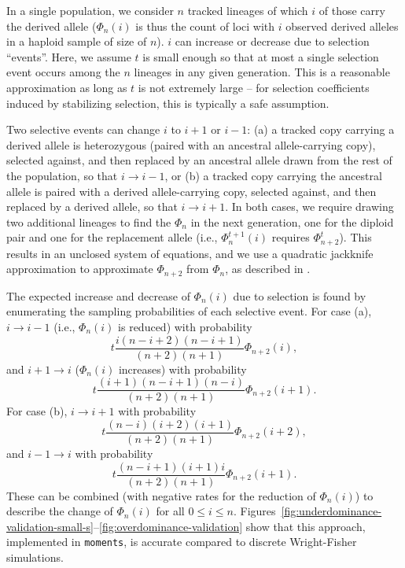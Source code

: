 \documentclass[]{article}
\newcommand{\moments}{\texttt{moments}\xspace}
\begin{document}
In a single population, we consider $n$ tracked lineages of which $i$ of those
carry the derived allele (\(\Phi_n(i)\) is thus the count of loci with $i$
observed derived alleles in a haploid sample of size of $n$). $i$ can increase
or decrease due to selection ``events''. Here, we assume $t$ is small enough so
that at most a single selection event occurs among the $n$ lineages in any
given generation. This is a reasonable approximation as long as $t$ is not
extremely large \citep{jouganous2017inferring, krukov2021taming} -- for
selection coefficients induced by stabilizing selection, this is typically a
safe assumption.

Two selective events can change $i$ to $i+1$ or $i-1$: (a) a tracked copy
carrying a derived allele is heterozygous (paired with an ancestral
allele-carrying copy), selected against, and then replaced by an ancestral
allele drawn from the rest of the population, so that \(i\rightarrow i-1\), or
(b) a tracked copy carrying the ancestral allele is paired with a derived
allele-carrying copy, selected against, and then replaced by a derived allele,
so that \(i\rightarrow i+1\). In both cases, we require drawing two additional
lineages to find the \(\Phi_n\) in the next generation, one for the diploid
pair and one for the replacement allele (i.e., \(\Phi_n^{t+1}(i)\) requires
\(\Phi_{n+2}^t\)). This results in an unclosed system of equations, and we use
a quadratic jackknife approximation to approximate \(\Phi_{n+2}\) from
\(\Phi_n\), as described in \citet{jouganous2017inferring}.

The expected increase and decrease of $\Phi_n(i)$ due to selection is found by
enumerating the sampling probabilities of each selective event. For case (a),
\(i\rightarrow i-1\) (i.e., \(\Phi_n(i)\) is reduced) with probability
\[t\frac{i(n-i+2)(n-i+1)}{(n+2)(n+1)}\Phi_{n+2}(i),\] and \(i+1\rightarrow i\)
(\(\Phi_n(i)\) increases) with probability
\[t\frac{(i+1)(n-i+1)(n-i)}{(n+2)(n+1)}\Phi_{n+2}(i+1).\] For case (b),
\(i\rightarrow i+1\) with probability
\[t\frac{(n-i)(i+2)(i+1)}{(n+2)(n+1)}\Phi_{n+2}(i+2),\] and \(i-1 \rightarrow
i\) with probability \[t\frac{(n-i+1)(i+1)i}{(n+2)(n+1)}\Phi_{n+2}(i+1).\]
These can be combined (with negative rates for the reduction of \(\Phi_n(i)\))
to describe the change of \(\Phi_n(i)\) for all \(0\leq i \leq n\).
Figures~\ref{fig:underdominance-validation-small-s}--\ref{fig:overdominance-validation}
show that this approach, implemented in \moments, is accurate compared to
discrete Wright-Fisher simulations.
\end{document}
